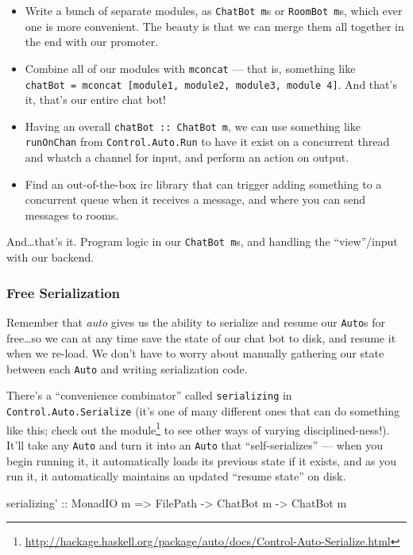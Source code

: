 \documentclass[]{article}
\newenvironment{Shaded}{}{}
\newcommand{\DataTypeTok}[1]{\textcolor[rgb]{0.56,0.13,0.00}{{#1}}}
\newcommand{\OtherTok}[1]{\textcolor[rgb]{0.00,0.44,0.13}{{#1}}}
\newcommand{\NormalTok}[1]{{#1}}
\renewcommand{\href}[2]{#2\footnote{\url{#1}}}
\begin{document}
\begin{itemize}
\tightlist
\item
  Write a bunch of separate modules, as \texttt{ChatBot\ m}s or
  \texttt{RoomBot\ m}s, which ever one is more convenient. The beauty is that we
  can merge them all together in the end with our promoter.
\item
  Combine all of our modules with \texttt{mconcat} --- that is, something like
  \texttt{chatBot\ =\ mconcat\ {[}module1,\ module2,\ module3,\ module\ 4{]}}.
  And that's it, that's our entire chat bot!
\item
  Having an overall \texttt{chatBot\ ::\ ChatBot\ m}, we can use something like
  \texttt{runOnChan} from \texttt{Control.Auto.Run} to have it exist on a
  concurrent thread and whatch a channel for input, and perform an action on
  output.
\item
  Find an out-of-the-box irc library that can trigger adding something to a
  concurrent queue when it receives a message, and where you can send messages
  to rooms.
\end{itemize}

And\ldots{}that's it. Program logic in our \texttt{ChatBot\ m}s, and handling
the ``view''/input with our backend.

\subsubsection{Free Serialization}\label{free-serialization}

Remember that \emph{auto} gives us the ability to serialize and resume our
\texttt{Auto}s for free\ldots{}so we can at any time save the state of our chat
bot to disk, and resume it when we re-load. We don't have to worry about
manually gathering our state between each \texttt{Auto} and writing
serialization code.

There's a ``convenience combinator'' called
\texttt{serializing\textquotesingle{}} in \texttt{Control.Auto.Serialize} (it's
one of many different ones that can do something like this;
\href{http://hackage.haskell.org/package/auto/docs/Control-Auto-Serialize.html}{check
out the module} to see other ways of varying disciplined-ness!). It'll take any
\texttt{Auto} and turn it into an \texttt{Auto} that ``self-serializes'' ---
when you begin running it, it automatically loads its previous state if it
exists, and as you run it, it automatically maintains an updated ``resume
state'' on disk.

\begin{Shaded}
\begin{Highlighting}[]
\OtherTok{serializing' ::} \DataTypeTok{MonadIO} \NormalTok{m }\OtherTok{=>} \NormalTok{FilePath }\OtherTok{->} \DataTypeTok{ChatBot} \NormalTok{m }\OtherTok{->} \DataTypeTok{ChatBot} \NormalTok{m}
\end{Highlighting}
\end{Shaded}
\end{document}

